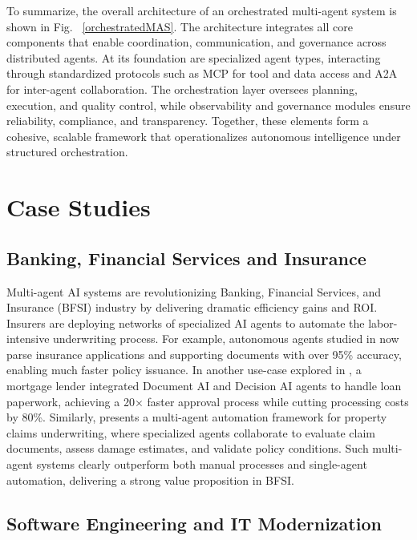 \documentclass[conference]{IEEEtran}
\begin{document}
To summarize, the overall architecture of an orchestrated multi-agent system is shown in Fig. ~\ref{orchestratedMAS}. The architecture integrates all core components that enable coordination, communication, and governance across distributed agents. At its foundation are specialized agent types, interacting through standardized protocols such as MCP for tool and data access and A2A for inter-agent collaboration. The orchestration layer oversees planning, execution, and quality control, while observability and governance modules ensure reliability, compliance, and transparency. Together, these elements form a cohesive, scalable framework that operationalizes autonomous intelligence under structured orchestration.



\section{Case Studies}

\subsection{Banking, Financial Services and Insurance}

Multi-agent AI systems are revolutionizing Banking, Financial Services, and Insurance (BFSI) industry by delivering dramatic efficiency gains and ROI. Insurers are deploying networks of specialized AI agents to automate the labor-intensive underwriting process. For example, autonomous agents studied in \cite{multimodal25} now parse insurance applications and supporting documents with over 95\% accuracy, enabling much faster policy issuance. In another use-case explored in \cite{multimodal25}, a mortgage lender integrated Document AI and Decision AI agents to handle loan paperwork, achieving a 20× faster approval process while cutting processing costs by 80\%.  Similarly,\cite{scirp25} presents a multi-agent automation framework for property claims underwriting, where specialized agents collaborate to evaluate claim documents, assess damage estimates, and validate policy conditions. Such multi-agent systems clearly outperform both manual processes and single-agent automation, delivering a strong value proposition in BFSI. 

\subsection{Software Engineering and IT Modernization}
\end{document}
